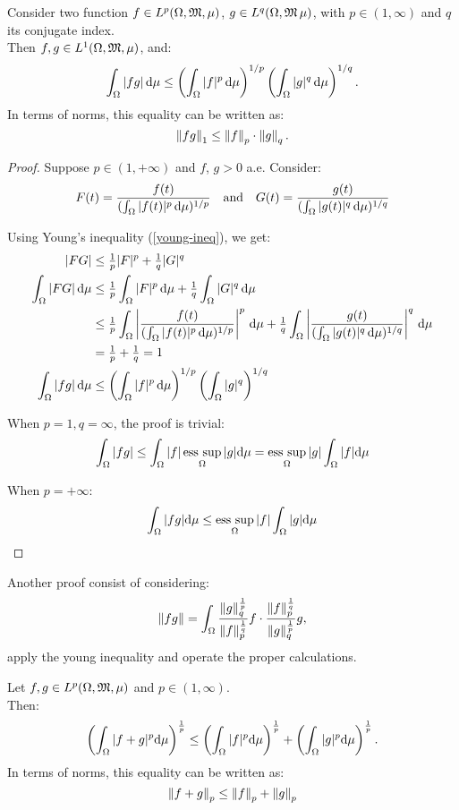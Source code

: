 \begin{prop}
	Consider two function $f\in L^p(\Omega,\mathfrak M,\mu)$, $g \in L^q(\Omega,\mathfrak M\,\mu)$, with $p \in (1, \infty)$ and $q$ its conjugate index.\\	
	Then $f,g \in L^1(\Omega,\mathfrak M,\mu)$, and:
	$$
	\int_\Omega |fg|\,\mathrm d \mu 
	\leq 	\left( \int_\Omega |f|^p \, \mathrm d \mu \right )^{1/p}
			\left( \int_\Omega |g|^q \, \mathrm d \mu \right )^{1/q}
	.
	$$
	In terms of norms, this equality can be written as:
	$$
	\left\lVert fg\right\rVert_1
	\leq \left\lVert f\right\rVert_p \cdot \left\lVert g\right\rVert_q
	.
	$$
\end{prop}
\begin{proof}
		Suppose $p\in(1, +\infty)$ and $f$, $g > 0$ a.e. Consider:
		$$F(t)=\frac{f(t)}{(\int_\Omega|f(t)|^p \,\mathrm d \mu)^{1/p}}
		\quad \text{and} \quad
		G(t)=\frac{g(t)}{(\int_\Omega|g(t)|^q \,\mathrm d \mu)^{1/q}}$$
		
		Using Young's inequality (\vref{young-ineq}), we get:
		\begin{align*}
			|FG| &\leq \tfrac 1 p |F|^p + \tfrac 1 q |G|^q \\
		   	\int_\Omega|FG| \,\mathrm d \mu &\leq \tfrac 1 p \int_\Omega|F|^p \,\mathrm d \mu + \tfrac 1 q \int_\Omega|G|^q \,\mathrm d \mu \\
			&\leq \tfrac 1 p \int_\Omega \left\lvert\frac{f(t)}{(\int_\Omega|f(t)|^p\,\mathrm d \mu)^{1/p}}\right\rvert^p \,\mathrm d \mu + \tfrac 1 q \int_\Omega \left\lvert\frac{g(t)}{(\int_\Omega|g(t)|^q\,\mathrm d \mu)^{1/q}}\right\rvert^q \,\mathrm d \mu \\
			&= \tfrac 1 p + \tfrac 1 q = 1 \\
			\int_\Omega |fg| \,\mathrm d \mu &\leq \left(\int_\Omega |f|^p \,\mathrm d \mu\right)^{1/p}\left( \int_\Omega |g|^q\right)^{1/q}
		\end{align*}
		
		When $p=1, q=\infty$, the proof is trivial:
		$$\int_\Omega|fg|\leq \int_\Omega |f| \operatorname*{ess\ sup}\limits_\Omega |g| \mathrm d \mu = \operatorname*{ess\ sup}\limits_\Omega |g| \int_\Omega |f| \mathrm d \mu$$
		
		When $p= +\infty$:
		$$\int_\Omega|fg| \mathrm d \mu \leq \operatorname*{ess\ sup}\limits_\Omega |f| \int_\Omega |g| \mathrm d \mu$$
\end{proof}

Another proof consist of considering: $$\left\lVert fg\right\rVert = \int_\Omega \frac{\left\lVert g\right\rVert_q^{\frac 1 p}}{\left\lVert f\right\rVert_p^{\frac 1 q}} f \cdot \frac{\left\lVert f\right\rVert_p^{\frac 1 q}}{\left\lVert g\right\rVert_q^{\frac 1 p}} g,$$ apply the young inequality and operate the proper calculations. 

\begin{prop}\label{prop-mink-ineq}
	Let $f, g \in L^p(\Omega,\mathfrak M,\mu)$ and $p \in (1, \infty)$.\\
	Then:
	$$\left(\int_\Omega |f+g|^p \mathrm d \mu \right)^{\frac 1 p} \leq \left(\int_\Omega |f|^p \mathrm d \mu\right)^{\frac 1 p}+\left(\int_\Omega |g|^p \mathrm d \mu\right)^{\frac 1 p}.$$
	In terms of norms, this equality can be written as:
	$$
	\left\lVert f+g\right\rVert_p
	\leq \left\lVert f\right\rVert_p + \left\lVert g\right\rVert_p
	$$
\end{prop}


